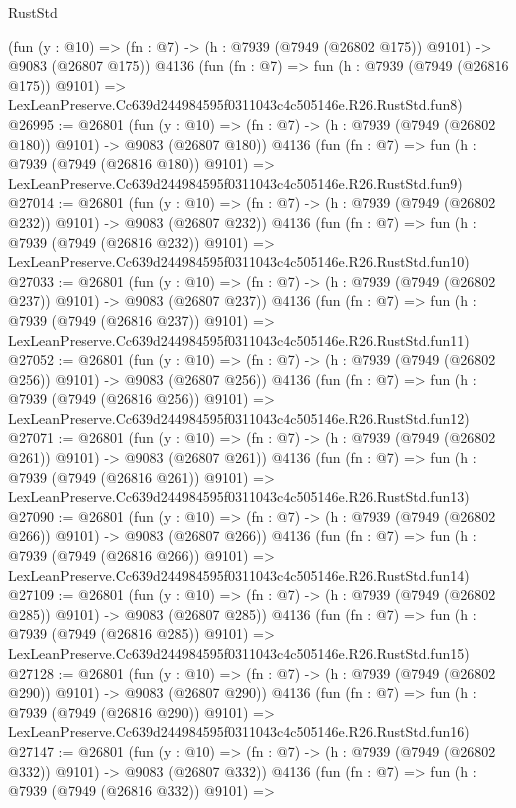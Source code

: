\begin{lexlean}{RustStd}
\begin{coremodule}
    (fun (y : @10) => (fn : @7) -> (h : @7939 (@7949 (@26802 @175)) @9101) -> @9083 (@26807 @175))
    @4136
    (fun (fn : @7) =>
    fun (h : @7939 (@7949 (@26816 @175)) @9101) =>
    LexLeanPreserve.Cc639d244984595f0311043c4c505146e.R26.RustStd.fun8)
@26995 := @26801
    (fun (y : @10) => (fn : @7) -> (h : @7939 (@7949 (@26802 @180)) @9101) -> @9083 (@26807 @180))
    @4136
    (fun (fn : @7) =>
    fun (h : @7939 (@7949 (@26816 @180)) @9101) =>
    LexLeanPreserve.Cc639d244984595f0311043c4c505146e.R26.RustStd.fun9)
@27014 := @26801
    (fun (y : @10) => (fn : @7) -> (h : @7939 (@7949 (@26802 @232)) @9101) -> @9083 (@26807 @232))
    @4136
    (fun (fn : @7) =>
    fun (h : @7939 (@7949 (@26816 @232)) @9101) =>
    LexLeanPreserve.Cc639d244984595f0311043c4c505146e.R26.RustStd.fun10)
@27033 := @26801
    (fun (y : @10) => (fn : @7) -> (h : @7939 (@7949 (@26802 @237)) @9101) -> @9083 (@26807 @237))
    @4136
    (fun (fn : @7) =>
    fun (h : @7939 (@7949 (@26816 @237)) @9101) =>
    LexLeanPreserve.Cc639d244984595f0311043c4c505146e.R26.RustStd.fun11)
@27052 := @26801
    (fun (y : @10) => (fn : @7) -> (h : @7939 (@7949 (@26802 @256)) @9101) -> @9083 (@26807 @256))
    @4136
    (fun (fn : @7) =>
    fun (h : @7939 (@7949 (@26816 @256)) @9101) =>
    LexLeanPreserve.Cc639d244984595f0311043c4c505146e.R26.RustStd.fun12)
@27071 := @26801
    (fun (y : @10) => (fn : @7) -> (h : @7939 (@7949 (@26802 @261)) @9101) -> @9083 (@26807 @261))
    @4136
    (fun (fn : @7) =>
    fun (h : @7939 (@7949 (@26816 @261)) @9101) =>
    LexLeanPreserve.Cc639d244984595f0311043c4c505146e.R26.RustStd.fun13)
@27090 := @26801
    (fun (y : @10) => (fn : @7) -> (h : @7939 (@7949 (@26802 @266)) @9101) -> @9083 (@26807 @266))
    @4136
    (fun (fn : @7) =>
    fun (h : @7939 (@7949 (@26816 @266)) @9101) =>
    LexLeanPreserve.Cc639d244984595f0311043c4c505146e.R26.RustStd.fun14)
@27109 := @26801
    (fun (y : @10) => (fn : @7) -> (h : @7939 (@7949 (@26802 @285)) @9101) -> @9083 (@26807 @285))
    @4136
    (fun (fn : @7) =>
    fun (h : @7939 (@7949 (@26816 @285)) @9101) =>
    LexLeanPreserve.Cc639d244984595f0311043c4c505146e.R26.RustStd.fun15)
@27128 := @26801
    (fun (y : @10) => (fn : @7) -> (h : @7939 (@7949 (@26802 @290)) @9101) -> @9083 (@26807 @290))
    @4136
    (fun (fn : @7) =>
    fun (h : @7939 (@7949 (@26816 @290)) @9101) =>
    LexLeanPreserve.Cc639d244984595f0311043c4c505146e.R26.RustStd.fun16)
@27147 := @26801
    (fun (y : @10) => (fn : @7) -> (h : @7939 (@7949 (@26802 @332)) @9101) -> @9083 (@26807 @332))
    @4136
    (fun (fn : @7) =>
    fun (h : @7939 (@7949 (@26816 @332)) @9101) =>

\end{coremodule}
\end{lexlean}
